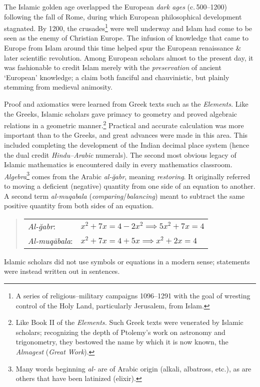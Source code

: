 The Islamic golden age overlapped the European \emph{dark ages} (c.\,500--1200) following the fall of Rome, during which European philosophical development stagnated. By 1200, the crusades\footnote{A series of religious--military campaigns 1096--1291 with the goal of wresting control of the Holy Land, particularly Jerusalem, from Islam.} were well underway and Islam had come to be seen as the enemy of Christian Europe. The infusion of knowledge that came to Europe from Islam around this time helped spur the European renaissance \& later scientific revolution. Among European scholars almost to the present day, it was fashionable to credit Islam merely with the \emph{preservation} of ancient `European' knowledge; a claim both fanciful and chauvinistic, but plainly stemming from medieval animosity.

\goodbreak



Proof and axiomatics were learned from Greek texts such as the \emph{Elements.} Like the Greeks, Islamic scholars gave primacy to geometry and proved algebraic relations in a geometric manner.\footnote{Like Book II of the \emph{Elements.} 
Such Greek texts were venerated by Islamic scholars; recognizing the depth of Ptolemy's work on astronomy and trigonometry, they bestowed the name by which it is now known, the \emph{Almagest} (\emph{Great Work}).} Practical and accurate calculation was more important than to the Greeks, and great advances were made in this area. This included completing the development of the Indian decimal place system (hence the dual credit \emph{Hindu--Arabic} numerals).\smallbreak
The second most obvious legacy of Islamic mathematics is encountered daily in every mathematics classroom. \emph{Algebra}\footnote{Many words beginning \emph{al-} are of Arabic origin (alkali, albatross, etc.), as are others that have been latinized (elixir).} comes from the Arabic \emph{al-ğabr}, meaning \emph{restoring}. It originally referred to moving a deficient (negative) quantity from one side of an equation to another. A second term \emph{al-muqabala} (\emph{comparing}/\emph{balancing}) meant to subtract the same positive quantity from both sides of an equation.
\begin{quote}
	\begin{tabular}{l@{\quad}l}
		\emph{Al-ğabr}:&$x^2+7x=4-2x^2\implies 5x^2+7x=4$\\[4pt]
		\emph{Al-muqābala}:&$x^2+7x=4+5x\implies x^2+2x=4$
	\end{tabular}
\end{quote}
Islamic scholars did not use symbols or equations in a modern sense; statements were instead written out in sentences.


